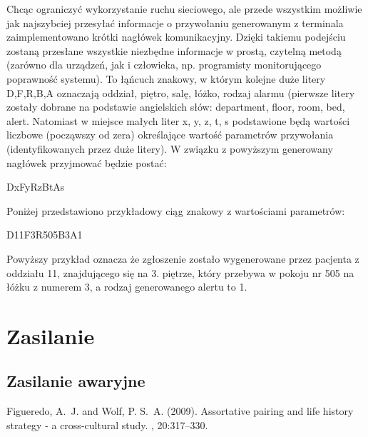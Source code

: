 \documentclass[12pt]{article} %
\begin{document}
Chcąc ograniczyć wykorzystanie ruchu sieciowego, ale przede wszystkim możliwie jak najszybciej przesyłać informacje o przywołaniu generowanym z terminala zaimplementowano krótki nagłówek komunikacyjny. Dzięki takiemu podejściu zostaną przesłane wszystkie niezbędne informacje w prostą, czytelną metodą (zarówno dla urządzeń, jak i człowieka, np. programisty monitorującego poprawność systemu). To łąńcuch znakowy, w którym kolejne duże litery D,F,R,B,A oznaczają oddział, piętro, salę, łóżko, rodzaj alarmu (pierwsze litery zostały dobrane na podstawie angielskich słów: department, floor, room, bed, alert. Natomiast w miejsce małych liter x, y, z, t, s podstawione będą wartości liczbowe (począwszy od zera) określające wartość parametrów przywołania (identyfikowanych przez duże litery). W związku z powyższym generowany nagłówek przyjmować będzie postać:
\begin{center}
DxFyRzBtAs
\end{center}
Poniżej przedstawiono przykładowy ciąg znakowy z wartościami parametrów:

\begin{center}
D11F3R505B3A1
\end{center}
Powyższy przykład oznacza że zgłoszenie zostało wygenerowane przez pacjenta z oddziału 11, znajdującego się na 3. piętrze, który przebywa w pokoju nr 505 na łóżku z numerem 3, a rodzaj  generowanego alertu to 1.

\section{Zasilanie}
\subsection{Zasilanie awaryjne}


\begin{thebibliography}{99} %

Figueredo, A.~J. and Wolf, P. S.~A. (2009).
\newblock Assortative pairing and life history strategy - a cross-cultural
  study.
, 20:317--330.
 
\end{thebibliography}

\end{document}
